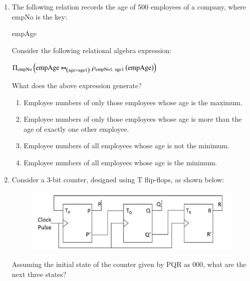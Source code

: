 \documentclass[a4paper, 11pt]{article}
\begin{document}
\begin{enumerate}
    \item The following relation records the age of 500 employees of a company, where empNo  is the key:\\
    \begin{center} 
    empAge
    \end{center}
    Consider the following relational algebra expression:
    \begin{center}
    $\Pi_{\text{empNo}}\brak{\text{empAge} \bowtie_{\brak{\text{age} > \text{age1}}} \rho_{\text{empNo1, age1}}\brak{\text{empAge}}}$
    \end{center}
    What does the above expression generate?
    \begin{enumerate}
        \item Employee numbers of only those employees whose age is the maximum.
        \item Employee numbers of only those employees whose age is more than the age of exactly one other employee.
        \item Employee numbers of all employees whose age is not the minimum.
        \item Employee numbers of all employees whose age is the minimum.
    \end{enumerate}
    \hfill{}
    
    \item Consider a 3-bit counter, designed using T flip-flops, as shown below:
    \begin{figure}[h]
        \centering
        \includegraphics[width=0.6\columnwidth]{figs/q38.png}
        \label{fig:placeholder}
    \end{figure}
    Assuming the initial state of the counter given by PQR as 000, what are the next three states?
    \begin{enumerate}
    \end{enumerate}
    \hfill{}
    

\end{enumerate}
\end{document}
